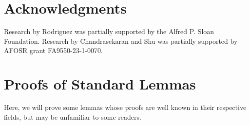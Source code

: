 \documentclass{article}
\numberwithin{equation}{section}
\begin{document}
\section{Acknowledgments}
Research by Rodriguez was partially supported by the Alfred P. Sloan Foundation.
Research by Chandrasekaran and Shu was partially supported by AFOSR grant FA9550-23-1-0070.




% 

\appendix
\section{Proofs of Standard Lemmas}
\label{app:proofs}
Here, we will prove some lemmas whose proofs are well known in their respective fields, but may be unfamiliar to some readers.
\end{document}

